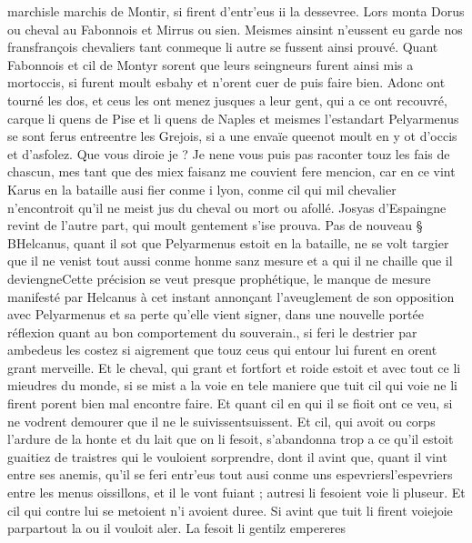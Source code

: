 \documentclass{article}
\begin{document}
\begin{pages}
   marchisle marchis de 
      Montir, si firent 
   d’entr’eus ii la dessevree. 
   Lors monta Dorus ou cheval au Fabonnois et 
   Mirrus ou sien. Meismes ainsint n’eussent eu garde nos 
   fransfrançois chevaliers tant 
      conmeque li autre se fussent ainsi prouvé. \pend
\pstart Quant Fabonnois et cil de Montyr 
   sorent que leurs seingneurs furent ainsi mis a mortoccis, 
   si furent moult esbahy et n’orent cuer de puis faire bien. Adonc ont tourné les dos, 
   et ceus les ont menez jusques a leur gent, qui a ce ont recouvré, carque 
   li quens de Pise et 
   li quens de Naples et meismes l’estandart 
   Pelyarmenus se sont ferus entreentre les 
   Grejois, 
   si a une envaïe queenot
   moult en y ot 
   d’occis et d’asfolez. Que vous diroie je ? Je 
      nene vous puis pas raconter touz les fais de chascun, 
      mes tant que des miex faisanz me couvient fere mencion, car en ce vint Karus 
   en la bataille ausi fier conme i lyon, conme cil qui mil chevalier n’encontroit qu’il ne meist jus du cheval ou mort ou afollé.
   Josyas d’Espaingne revint de l’autre part, 
   qui moult gentement s’ise prouva. \pend
\pstart Pas de nouveau § BHelcanus, quant il sot que 
   Pelyarmenus estoit en la bataille, ne se volt targier que il ne venist tout aussi 
   conme honme sanz mesure et a qui il ne chaille que il deviengneCette précision se veut presque 
   prophétique, le manque de mesure manifesté par Helcanus à cet instant annonçant l'aveuglement de son opposition avec Pelyarmenus
   et sa perte qu'elle vient signer, dans une nouvelle portée réflexion quant au bon comportement du souverain., 
   si feri le destrier par ambedeus les costez si aigrement 
   que touz ceus qui entour lui furent en orent grant merveille. Et le cheval, qui grant et 
   fortfort et roide estoit et avec tout ce li 
   mieudres du monde, si se mist a la voie en tele maniere que tuit cil qui voie ne li firent porent bien mal encontre faire. 
   Et quant cil en qui il se fioit ont ce veu, si ne vodrent demourer que il ne le 
   suivissentsuissent. Et cil, qui avoit ou corps l’ardure 
   de la honte et du lait que on li fesoit, s’abandonna trop a ce qu’il estoit guaitiez de traistres qui le vouloient sorprendre, 
   dont il avint que, quant il vint entre ses anemis, qu’il se feri entr’eus tout ausi conme 
   uns espevriersl'espevriers entre les menus oissillons, 
   et il le vont fuiant ; autresi li fesoient voie li pluseur. Et cil qui contre lui se metoient n’i avoient duree. 
   Si avint que tuit li firent 
   voiejoie
   parpartout la ou il vouloit aler. 
   La fesoit li gentilz empereres 

\end{pages}
\end{document}
